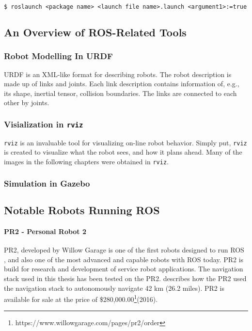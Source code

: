 \begin{verbatim}
$ roslaunch <package name> <launch file name>.launch <argument1>:=true
\end{verbatim}

\subsection{An Overview of ROS-Related Tools}

\subsubsection{Robot Modelling In URDF}

\ac{URDF} is an XML-like format for describing robots. The robot description is made up of links and joints. Each link description contains information of, e.g., its shape, inertial tensor, collision boundaries. The links are connected to each other by joints.

\subsubsection{Visialization in \texttt{rviz}}

\texttt{rviz} is an invaluable tool for visualizing on-line robot behavior. Simply put, \texttt{rviz} is created to visualize what the robot sees, and how it plans ahead. Many of the images in the following chapters were obtained in \texttt{rviz}. 

\subsubsection{Simulation in Gazebo}


\subsection{Notable Robots Running ROS}

\paragraph{PR2 - Personal Robot 2}

PR2, developed by Willow Garage is one of the first robots designed to run \ac{ROS} \cite{rosbook15}, and also one of the most advanced and capable robots with \ac{ROS} today. PR2 is build for research and development of service robot applications. The navigation stack used in this thesis has been tested on the PR2. \cite{tbd} describes how the PR2 used the navigation stack to autonomously navigate 42 km (26.2 miles). PR2 is available for sale at the price of \$280,000.00\footnote{https://www.willowgarage.com/pages/pr2/order}(2016).

